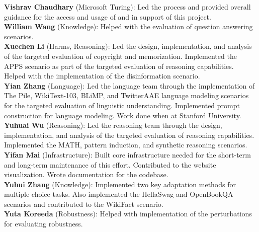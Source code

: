 \textbf{Vishrav Chaudhary} (Microsoft Turing): Led the process and provided overall guidance for the access and usage of \mtnlgseven and \mtnlgfivethreezero in support of this project. \\
\textbf{William Wang} (Knowledge): Helped with the evaluation of question answering scenarios. \\ 
\textbf{Xuechen Li} (Harms, Reasoning): Led the design, implementation, and analysis of the targeted evaluation of copyright and memorization. 
Implemented the APPS scenario as part of the targeted evaluation of reasoning capabilities. Helped with the implementation of the disinformation scenario. \\ 
\textbf{Yian Zhang} (Language): Led the language team through the implementation of The Pile, WikiText-103, BLiMP, and TwitterAAE language modeling scenarios for the targeted evaluation of linguistic understanding. Implemented prompt construction for language modeling. Work done when at Stanford University. \\ 
\textbf{Yuhuai Wu} (Reasoning): Led the reasoning team through the design, implementation, and analysis of the targeted evaluation of reasoning capabilities. 
Implemented the MATH, pattern induction, and synthetic reasoning scenarios. \\ 
\textbf{Yifan Mai} (Infrastructure): Built core infrastructure needed for the short-term and long-term maintenance of this effort. Contributed to the website visualization. Wrote documentation for the codebase. \\ 
\textbf{Yuhui Zhang} (Knowledge): Implemented two key adaptation methods for multiple choice tasks. Also implemented the HellaSwag and OpenBookQA scenarios and contributed to the WikiFact scenario. \\ 
\textbf{Yuta Koreeda} (Robustness): Helped with implementation of the perturbations for evaluating robustness. \\